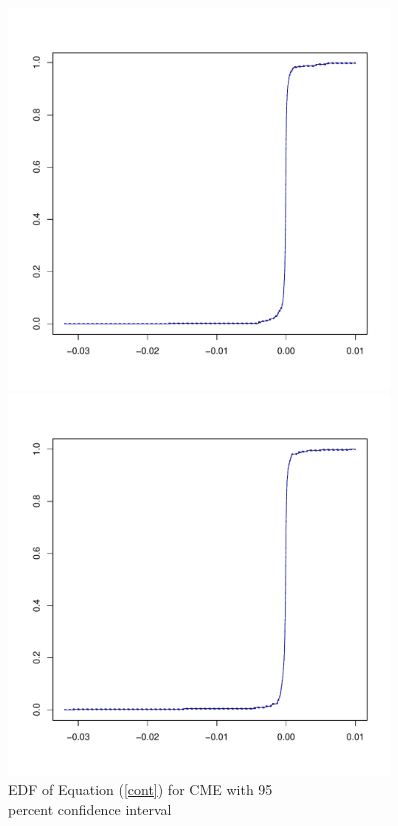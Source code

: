 \documentclass{paper}
\let\oldref\ref
\renewcommand{\ref}[1]{(\oldref{#1})}
\begin{document}
\begin{doublespacing}
\begin{figure}[H]
    \centering
    \begin{minipage}{0.5\textwidth}
        \centering
        \includegraphics[width=0.9\textwidth]{CME.pdf} %
        \caption{EDF of Equation \ref{cont} for CME with 95\\ percent confidence interval}\label{edfcme}
    \end{minipage}\hfill
    \begin{minipage}{0.5\textwidth}
        \centering
        \includegraphics[width=0.9\textwidth]{CBOE.pdf} %

\end{minipage}
\end{figure}
\end{doublespacing}
\end{document}

